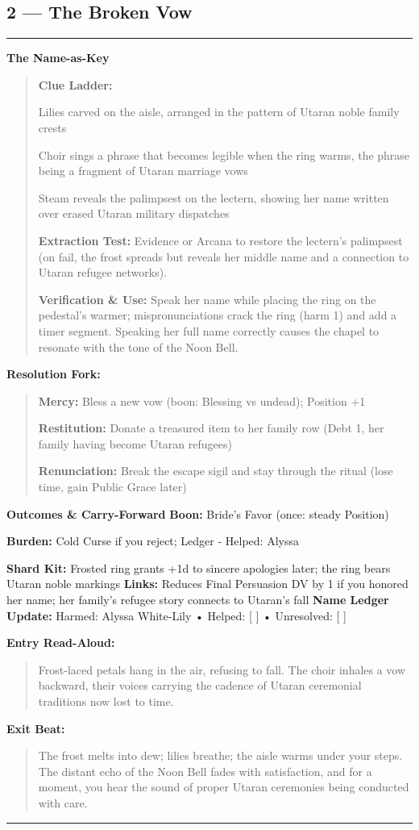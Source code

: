 \documentclass[18pt, letterpaper, twoside]{article}
\newenvironment{floorbox}[1]{%
    \begin{center}
    \begin{minipage}{0.95\textwidth}
    \subsection*{#1}
    \vspace{-0.5em}
    \rule{\textwidth}{0.5pt}
    \vspace{0.5em}
}{%
    \vspace{0.5em}
    \rule{\textwidth}{0.5pt}
    \end{minipage}
    \end{center}
}
\newenvironment{gmnote}[1]{%
    \vspace{0.5em}
    \noindent\textbf{#1}
    \begin{quote}
}{%
    \end{quote}
    \vspace{0.5em}
}
\newenvironment{resolutionbox}{%
    \vspace{0.5em}
    \noindent\textbf{Resolution Fork:}
    \begin{quote}
}{%
    \end{quote}
    \vspace{0.5em}
}
\newenvironment{boxedtext}[1]{%
    \vspace{0.5em}
    \noindent\textbf{#1}
    \begin{quote}
}{%
    \end{quote}
    \vspace{0.5em}
}
\newcommand{\boon}[1]{\noindent\textbf{Boon:} #1\par}
\newcommand{\burden}[1]{\noindent\textbf{Burden:} #1\par}
\newcommand{\entrytext}[1]{\begin{boxedtext}{Entry Read-Aloud:} #1 \end{boxedtext}}
\newcommand{\exittext}[1]{\begin{boxedtext}{Exit Beat:} #1 \end{boxedtext}}
\begin{document}
\begin{floorbox}{2 --- The Broken Vow}
\begin{gmnote}{The Name-as-Key}
\textbf{Clue Ladder:}
\begin{description}[leftmargin=*, style=unboxed]
    \item[Gentle Nudge:] Lilies carved on the aisle, arranged in the pattern of Utaran noble family crests
    \item[Actionable Lead:] Choir sings a phrase that becomes legible when the ring warms, the phrase being a fragment of Utaran marriage vows
    \item[Aha! Proof:] Steam reveals the palimpsest on the lectern, showing her name written over erased Utaran military dispatches
\end{description}

\textbf{Extraction Test:} Evidence or Arcana to restore the lectern's palimpsest (on fail, the frost spreads but reveals her middle name and a connection to Utaran refugee networks).

\textbf{Verification \& Use:} Speak her name while placing the ring on the pedestal's warmer; mispronunciations crack the ring (harm 1) and add a timer segment. Speaking her full name correctly causes the chapel to resonate with the tone of the Noon Bell.
\end{gmnote}

\begin{resolutionbox}
\textbf{Mercy:} Bless a new vow (boon: Blessing vs undead); Position +1

\textbf{Restitution:} Donate a treasured item to her family row (Debt 1, her family having become Utaran refugees)

\textbf{Renunciation:} Break the escape sigil and stay through the ritual (lose time, gain Public Grace later)
\end{resolutionbox}

\textbf{Outcomes \& Carry-Forward}
\boon{Bride's Favor (once: steady Position)}
\burden{Cold Curse if you reject; Ledger - Helped: Alyssa}
\textbf{Shard Kit:} Frosted ring grants +1d to sincere apologies later; the ring bears Utaran noble markings
\textbf{Links:} Reduces Final Persuasion DV by 1 if you honored her name; her family's refugee story connects to Utaran's fall
\textbf{Name Ledger Update:} Harmed: Alyssa White-Lily • Helped: [ ] • Unresolved: [ ]

\entrytext{Frost-laced petals hang in the air, refusing to fall. The choir inhales a vow backward, their voices carrying the cadence of Utaran ceremonial traditions now lost to time.}

\exittext{The frost melts into dew; lilies breathe; the aisle warms under your steps. The distant echo of the Noon Bell fades with satisfaction, and for a moment, you hear the sound of proper Utaran ceremonies being conducted with care.}
\end{floorbox}
\end{document}
